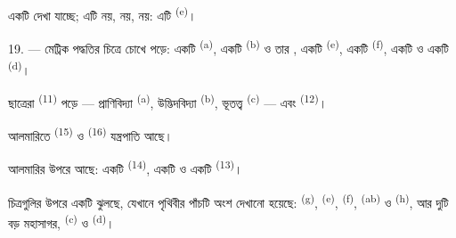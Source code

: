 একটি  দেখা যাচ্ছে; এটি  নয়, 
নয়,  নয়: এটি  \textsuperscript{(e)}।

19. --- মেট্রিক পদ্ধতির চিত্রে চোখে পড়ে: একটি 
\textsuperscript{(a)}, একটি  \textsuperscript{(b)} ও তার
, একটি  \textsuperscript{(e)}, একটি
 \textsuperscript{(f)}, একটি  ও একটি
 \textsuperscript{(d)}।

ছাত্রেরা  \textsuperscript{(11)} পড়ে ---
প্রাণিবিদ্যা \textsuperscript{(a)}, উদ্ভিদবিদ্যা \textsuperscript{(b)},
ভূতত্ত্ব \textsuperscript{(c)} --- এবং  \textsuperscript{(12)}।

আলমারিতে  \textsuperscript{(15)} ও 
\textsuperscript{(16)} যন্ত্রপাতি আছে।

আলমারির উপরে আছে: একটি  \textsuperscript{(14)}, একটি
 ও একটি  \textsuperscript{(13)}।

চিত্রগুলির উপরে একটি  ঝুলছে, যেখানে পৃথিবীর পাঁচটি অংশ
দেখানো হয়েছে:  \textsuperscript{(g)}, 
\textsuperscript{(e)},  \textsuperscript{(f)}, 
\textsuperscript{(ab)} ও  \textsuperscript{(h)}, আর দুটি বড়
মহাসাগর,  \textsuperscript{(c)} ও 
\textsuperscript{(d)}।
\VUsaut{6.0mm}
\VUfilet{22mm}
